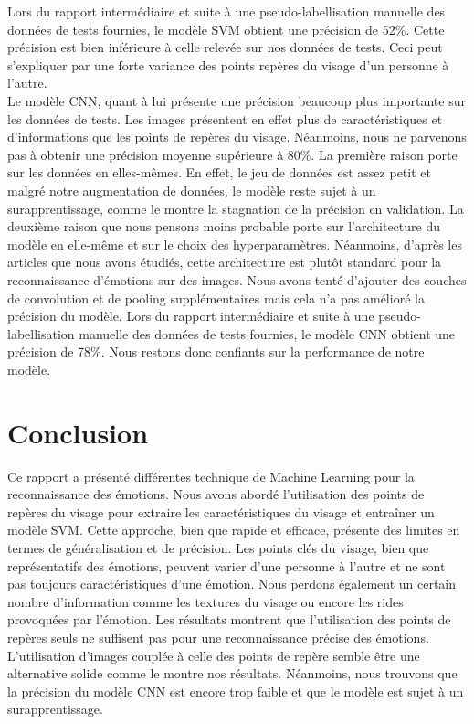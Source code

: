\documentclass{rapport}
\begin{document}
Lors du rapport intermédiaire et suite à une pseudo-labellisation manuelle des données de tests fournies, le modèle SVM obtient une précision de 52\%.
Cette précision est bien inférieure à celle relevée sur nos données de tests. Ceci peut s'expliquer par une forte variance des points repères du visage
d'un personne à l'autre.\\

Le modèle CNN, quant à lui présente une précision beaucoup plus importante sur les données de tests. Les images présentent en effet plus de caractéristiques
et d'informations que les points de repères du visage. Néanmoins, nous ne parvenons pas à obtenir une précision moyenne supérieure à 80\%. La première raison
porte sur les données en elles-mêmes. En effet, le jeu de données est assez petit et malgré notre augmentation de données, le modèle reste sujet à un surapprentissage,
comme le montre la stagnation de la précision en validation. La deuxième raison que nous pensons moins probable porte sur l'architecture du modèle en elle-même et sur le choix
des hyperparamètres. Néanmoins, d'après les articles que nous avons étudiés, cette architecture est plutôt standard pour la reconnaissance d'émotions sur des images.
Nous avons tenté d'ajouter des couches de convolution et de pooling supplémentaires mais cela n'a pas amélioré la précision du modèle.
Lors du rapport intermédiaire et suite à une pseudo-labellisation manuelle des données de tests fournies, le modèle CNN obtient une précision de 78\%.
Nous restons donc confiants sur la performance de notre modèle.


\section{Conclusion}
Ce rapport a présenté différentes technique de Machine Learning pour la reconnaissance des émotions.
Nous avons abordé l'utilisation des points de repères du visage pour extraire les caractéristiques du visage et entraîner un modèle SVM.
Cette approche, bien que rapide et efficace, présente des limites en termes de généralisation et de précision. Les points clés du visage,
bien que représentatifs des émotions, peuvent varier d'une personne à l'autre et ne sont pas toujours caractéristiques d'une émotion.
Nous perdons également un certain nombre d'information comme les textures du visage ou encore les rides provoquées par l'émotion.
Les résultats montrent que l'utilisation des points de repères seuls ne suffisent pas pour une reconnaissance précise des émotions.
L'utilisation d'images couplée à celle des points de repère semble être une alternative solide comme le montre nos résultats. Néanmoins, nous
trouvons que la précision du modèle CNN est encore trop faible et que le modèle est sujet à un surapprentissage.




\end{document}
